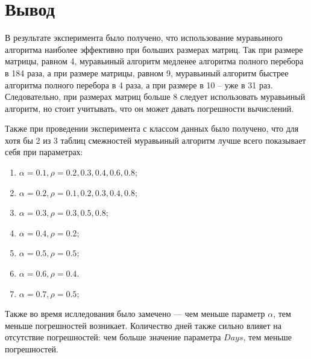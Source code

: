 \section*{Вывод}

В результате эксперимента было получено, что использование муравьиного алгоритма наиболее эффективно при больших размерах матриц. Так при размере матрицы, равном 4, муравьиный алгоритм медленее алгоритма полного перебора в 184 раза, а при размере матрицы, равном 9, муравьиный алгоритм быстрее алгоритма полного перебора в 4 раза, а при размере в 10 -- уже в 31 раз. Следовательно, при размерах матриц больше 8 следует использовать муравьиный алгоритм, но стоит учитывать, что он может давать погрешности вычислений.

Также при проведении эксперимента с классом данных было получено, что для хотя бы 2 из 3 таблиц смежностей муравьиный алгоритм лучше всего показывает себя при параметрах:
\begin{enumerate}[label=\arabic*)]
    \item $\alpha = 0.1, \rho = 0.2, 0.3, 0.4, 0.6, 0.8$;
    \item $\alpha = 0.2, \rho = 0.1, 0.2, 0.3, 0.4, 0.8$;
    \item $\alpha = 0.3, \rho = 0.3, 0.5, 0.8$;
    \item $\alpha = 0.4, \rho = 0.2$;
    \item $\alpha = 0.5, \rho = 0.5$;
    \item $\alpha = 0.6, \rho = 0.4$.
    \item $\alpha = 0.7, \rho = 0.5$;
\end{enumerate}  

Также во время ислледования было замечено --- чем меньше параметр $\alpha$, тем меньше погрешностей возникает. Количество дней также сильно влияет на отсутствие погрешностей: чем больше значение параметра $Days$, тем меньше погрешностей.